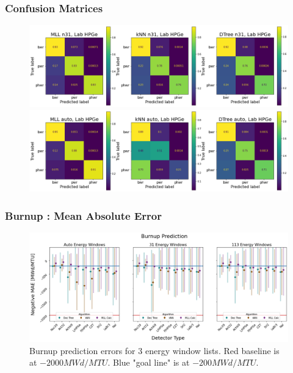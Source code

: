 \begin{frame}
  \frametitle{Confusion Matrices}
  \begin{adjustwidth}{-20pt}{0pt}
  \vspace*{-0.5cm}
  \begin{figure}[t!]
    \centering
    \includegraphics[height=0.45\textheight]{./figures/confusion_matrix_n31_d1.png}
    \includegraphics[height=0.45\textheight]{./figures/confusion_matrix_auto_d1.png}
  \end{figure}
  \end{adjustwidth}
\end{frame}

\begin{frame}
  \frametitle{Burnup : Mean Absolute Error}
  \begin{adjustwidth}{-25pt}{0pt}
  \begin{figure}
    \centering
    \includegraphics[width=1.15\textwidth]{./figures/detector_preds_wrt_enlist_burnup.png}
    \captionsetup{margin=0.6cm}
    \caption{Burnup prediction errors for 3 energy window lists. 
             Red baseline is at $-2000 MWd/MTU$. Blue "goal line" is at $-200 MWd/MTU$.}
  \end{figure}
  \end{adjustwidth}
\end{frame}

